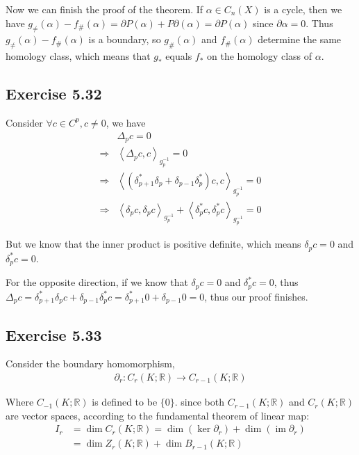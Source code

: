 \documentclass[]{ctexart}
\begin{document}
		Now we can finish the proof of the theorem. If $\alpha \in C_{n}(X)$ is a cycle, then we have $g_{\neq}(\alpha)-f_{\#}(\alpha)=\partial P(\alpha)+P \partial(\alpha)=\partial P(\alpha)$ since $\partial \alpha=0 .$ Thus $g_{\neq}(\alpha)-f_{\#}(\alpha)$ is
		a boundary, so $g_{\#}(\alpha)$ and $f_{\#}(\alpha)$ determine the same homology class, which means that $g_{*}$ equals $f_{*}$ on the homology class of $\alpha$. 
		
	\subsection{Exercise 5.32}
		Consider $\forall c\in C^p, c\neq 0$, we have
			\begin{equation*}
			\begin{aligned}
				&\Delta_p c=0\\
				\Rightarrow  &\left\langle \Delta_pc,c\right\rangle_{g_p^{-1}}=0\\
				\Rightarrow  &\left\langle (\delta^*_{p+1}\delta_p+\delta_{p-1}\delta^*_p)c,c\right\rangle_{g_p^{-1}}=0\\
				\Rightarrow &\left\langle\delta_pc,\delta_pc\right\rangle_{g_p^{-1}}+\left\langle\delta_p^*c,\delta_p^*c\right\rangle_{g_p^{-1}}=0
			\end{aligned}
			\end{equation*}
			
		But we know that the inner product is positive definite, which means $\delta_pc=0$ and $\delta_p^*c=0$. 
		
		For the opposite direction, if we know that $\delta_pc=0$ and $\delta_p^*c=0$, thus $\Delta_pc=\delta^*_{p+1}\delta_pc+\delta_{p-1}\delta^*_pc=\delta^*_{p+1}0+\delta_{p-1}0=0$, thus our proof finishes. 
		
	\subsection{Exercise 5.33}
		Consider the boundary homomorphism,
			\begin{equation*}
			\begin{aligned}
				\partial_{r}: C_{r}(K ; \mathbb{R}) \rightarrow C_{r-1}(K ; \mathbb{R})
			\end{aligned}
			\end{equation*}
			
		Where $C_{-1}(K ; \mathbb{R})$ is defined to be $\{0\} .$ since both $C_{r-1}(K ; \mathbb{R})$ and $C_{r}(K ; \mathbb{R})$ are vector spaces, according to the fundamental theorem of linear map:
			\begin{equation*}
			\begin{aligned}
			I_{r} &=\operatorname{dim} C_{r}(K ; \mathbb{R})=\operatorname{dim}\left(\operatorname{ker} \partial_{r}\right)+\operatorname{dim}\left(\operatorname{im} \partial_{r}\right) \\
			&=\operatorname{dim} Z_{r}(K ; \mathbb{R})+\operatorname{dim} B_{r-1}(K ; \mathbb{R})
			\end{aligned}
			\end{equation*}
			
\end{document}
